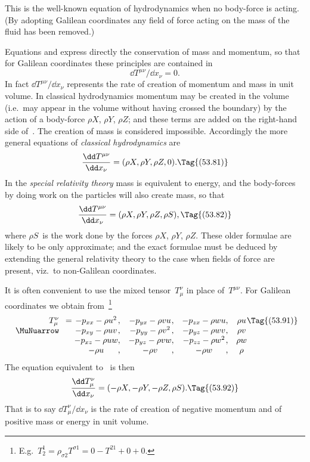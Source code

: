 \documentclass[12pt]{book}
\begin{document}
This is the well-known equation of hydrodynamics when no body-force is
%
acting. (By adopting Galilean coordinates any field of force acting on the
mass of the fluid has been removed.)

Equations  and  express directly the conservation of mass
and momentum, so that for Galilean coordinates these principles are contained
%
in
\[
\dd T^{\mu\nu}/\dd x_{\nu} = 0.
\]
In fact $\dd T^{\mu\nu}/\dd x_{\nu}$ represents the rate of creation of momentum and mass in
unit volume. In classical hydrodynamics momentum may be created in the
volume (i.e.\ may appear in the volume without having crossed the boundary)
by the action of a body-force $\rho X$, $\rho Y$, $\rho Z$; and these terms are added on the
right-hand side of~. The creation of mass is considered impossible.
Accordingly the more general equations of \emph{classical hydrodynamics} are
\[
\frac{\dd T^{\mu\nu}}{\dd x_{\nu}} = (\rho X, \rho Y, \rho Z, 0).
\Tag{(53.81)}
\]
In the \emph{special relativity theory} mass is equivalent to energy, and the body-forces
by doing work on the particles will also create mass, so that
\[
\frac{\dd T^{\mu\nu}}{\dd x_{\nu}} = (\rho X, \rho Y, \rho Z, \rho S),
\Tag{(53.82)}
\]
where $\rho S$~is the work done by the forces $\rho X$, $\rho Y$, $\rho Z$. These older formulae
are likely to be only approximate; and the exact formulae must be deduced
by extending the general relativity theory to the case when fields of force are
present, viz.\ to non-Galilean coordinates.

It is often convenient to use the mixed tensor~$T_{\mu}^{\nu}$ in place of~$T^{\mu\nu}$. For
Galilean coordinates we obtain from~\footnote
  {E.g.\ $T_{2}^{1} = \rho_{\sigma 2} T^{\sigma 1} = 0 - T^{21} + 0 + 0$.}
\[
\begin{array}[t]{r}
  T_{\mu}^{\nu} \\
  \MuNuarrow
\end{array}
=
\begin{array}[t]{@{}c@{,\quad}c@{,\quad}c@{,\quad}c@{}}
  -p_{xx} - \rho u^{2} & -p_{yx} - \rho v u & -p_{zx} - \rho w u & \rho u\\
  -p_{xy} - \rho u v & -p_{yy} - \rho v^{2} & -p_{yz} - \rho w v & \rho v\\
  -p_{xz} - \rho u w & -p_{yz} - \rho v w & -p_{zz} - \rho w^{2} & \rho w\\
  -\rho u & -\rho v & -\rho w & \rho\\
\end{array}
\Tag{(53.91)}
\]
The equation equivalent to~ is then
\[
\frac{\dd T_{\mu}^{\nu}}{\dd x_{\nu}} = (-\rho X,-\rho Y,-\rho Z, \rho S).
\Tag{(53.92)}
\]
That is to say $\dd T_{\mu}^{\nu}/\dd x_{\nu}$ is the rate of creation of negative momentum and of
positive mass or energy in unit volume.
\end{document}
